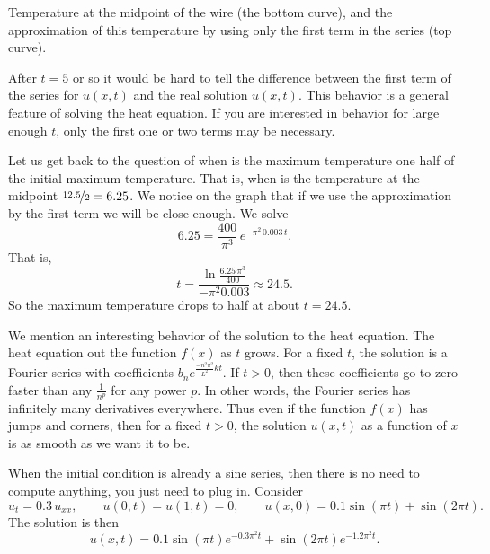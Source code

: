 \begin{exampleSol}
\begin{myfig}
\capstart
{}
\caption{Temperature at the midpoint of the wire (the bottom curve),
and the approximation of this temperature by using only the first term in
the series (top curve).\label{heat:wireexmaxfig}}
\end{myfig}

After $t=5$ or so
it would be hard to tell the difference
between the first term of the series for $u(x,t)$ and 
the real solution $u(x,t)$.  This behavior
is a general feature of solving the heat equation.
If you are interested in behavior for large enough $t$, only the
first one or two terms may be necessary.

Let us
get back to the question of when is the maximum temperature one half of the
initial maximum temperature.  That is, when is the temperature
at the midpoint $\nicefrac{12.5}{2} = 6.25$.  We notice on the graph that if we use
the approximation by the first term we will be close enough.  We
solve
\begin{equation*}
6.25 =
\frac{400}{\pi^3}
\, e^{-\pi^2 \, 0.003 \, t} .
\end{equation*}
That is,
\begin{equation*}
t =
\frac{\ln \frac{6.25\,\pi^3}{400}}{-\pi^2 0.003}
\approx 24.5 .
\end{equation*}
So the maximum temperature drops to half at about $t=24.5$.
\end{exampleSol}

We mention an interesting behavior of the solution to the heat equation.
The heat equation
 out the function $f(x)$ as $t$ grows.  For a fixed $t$,
the solution is a Fourier series with coefficients
$b_n e^{\frac{-n^2 \pi^2}{L^2} k t}$.  If $t > 0$, then these coefficients
go to zero faster than any $\frac{1}{n^p}$ for any power $p$.  In other
words, the Fourier series has infinitely many derivatives everywhere.
Thus even if the function $f(x)$ has jumps and corners, then for
a fixed $t > 0$, the solution
$u(x,t)$ as a function of $x$ is as smooth as we want it
to be.

\begin{example}
When the initial condition is already a sine series, then there is no need
to compute anything, you just need to plug in.  Consider
\begin{equation*}
u_t = 0.3 \, u_{xx}, \qquad u(0,t)=u(1,t)=0, \qquad u(x,0) = 0.1 \sin(\pi t) +
\sin(2\pi t) .
\end{equation*}
The solution is then
\begin{equation*}
u(x,t) =
0.1 \sin(\pi t) e^{- 0.3 \pi^2 t}
+ 
\sin(2 \pi t) e^{- 1.2 \pi^2 t} .
\end{equation*}
\end{example}

